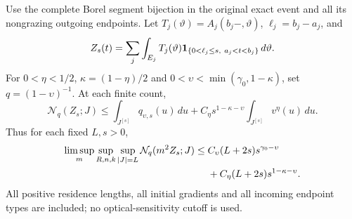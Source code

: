 \begin{theorem}
\label{thm:v88-weighted-trace}
Use the complete Borel segment bijection in the original exact
event and all its nongrazing outgoing endpoints. Let
$T_j(\vartheta)=A_j(b_j-,\vartheta)$, $\ell_j=b_j-a_j$, and
\[
 Z_s(t)=\sum_j\int_{E_j}
          T_j(\vartheta)\one_{\{0<\ell_j\le s,\ a_j<t<b_j\}}\,d\vartheta.
\]
For $0<\eta<1/2$, $\kappa=(1-\eta)/2$ and
$0<\upsilon<\min(\gamma_0,1-\kappa)$, set $q=(1-\upsilon)^{-1}$.
At each finite count,
\begin{equation}\label{eq:v88-surface-before-limit}
 \mathcal N_q(Z_s;J)
 \le\int_{J^{[s]}}q_{\upsilon,s}(u)\,du
       +C_\eta s^{1-\kappa-\upsilon}
                              \int_{J^{[s]}}v^\eta(u)\,du.
\end{equation}
Thus for each fixed $L,s>0$,
\begin{align}
 \limsup_m\sup_{R,n,k}\sup_{|J|=L}
                      \mathcal N_q(m^2Z_s;J)
 \le{}& C_\upsilon(L+2s)s^{\gamma_0-\upsilon}\notag\\
      &+C_\eta(L+2s)s^{1-\kappa-\upsilon}.
                                      \label{eq:v88-short-weak}
\end{align}
All positive residence lengths, all initial gradients and all incoming
endpoint types are included; no optical-sensitivity cutoff is used.
\end{theorem}
